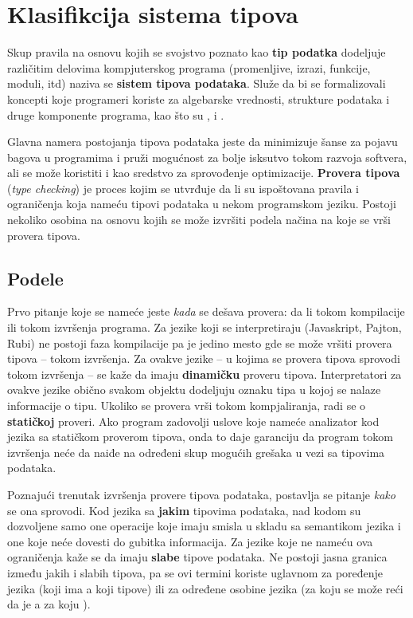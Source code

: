 \section{Klasifikcija sistema tipova}

Skup pravila na osnovu kojih se svojstvo poznato kao \textbf{tip podatka} dodeljuje različitim delovima kompjuterskog programa (promenljive, izrazi, funkcije, moduli, itd) naziva se \textbf{sistem tipova podataka}.
Služe da bi se formalizovali koncepti koje programeri koriste za algebarske vrednosti, strukture podataka i druge komponente programa, kao što su ,  i .

Glavna namera postojanja tipova podataka jeste da minimizuje šanse za pojavu bagova u programima i pruži mogućnost za bolje isksutvo tokom razvoja softvera, ali se može koristiti i kao sredstvo za sprovođenje optimizacije.
\textbf{Provera tipova} (\textsl{type checking}) je proces kojim se utvrđuje da li su ispoštovana pravila i ograničenja koja nameću tipovi podataka u nekom programskom jeziku.
Postoji nekoliko osobina na osnovu kojih se može izvršiti podela načina na koje se vrši provera tipova.

\subsection{Podele}

Prvo pitanje koje se nameće jeste \textit{kada} se dešava provera: da li tokom kompilacije ili tokom izvršenja programa.
Za jezike koji se interpretiraju (Javaskript, Pajton, Rubi) ne postoji faza kompilacije pa je jedino mesto gde se može vršiti provera tipova -- tokom izvršenja.
Za ovakve jezike -- u kojima se provera tipova sprovodi tokom izvršenja -- se kaže da imaju \textbf{dinamičku} proveru tipova.
Interpretatori za ovakve jezike obično svakom objektu dodeljuju oznaku tipa u kojoj se nalaze informacije o tipu.
Ukoliko se provera vrši tokom kompjaliranja, radi se o \textbf{statičkoj} proveri.
Ako program zadovolji uslove koje nameće analizator kod jezika sa statičkom proverom tipova, onda to daje garanciju da program tokom izvršenja neće da naiđe na određeni skup mogućih grešaka u vezi sa tipovima podataka.

Poznajući trenutak izvršenja provere tipova podataka, postavlja se pitanje \textit{kako} se ona sprovodi.
Kod jezika sa \textbf{jakim} tipovima podataka, nad kodom su dozvoljene samo one operacije koje imaju smisla u skladu sa semantikom jezika i one koje neće dovesti do gubitka informacija.
Za jezike koje ne nameću ova ograničenja kaže se da imaju \textbf{slabe} tipove podataka.
Ne postoji jasna granica između jakih i slabih tipova, pa se ovi termini koriste uglavnom za poređenje jezika (koji ima  a koji  tipove) ili za određene osobine jezika (za koju se može reći da je  a za koju ).

